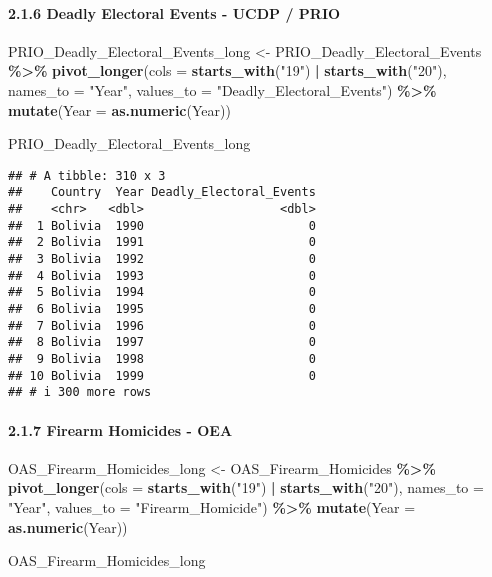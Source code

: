 \documentclass[
  11pt,
]{article}
\newenvironment{Shaded}{\begin{snugshade}}{\end{snugshade}}
\newcommand{\AttributeTok}[1]{\textcolor[rgb]{0.13,0.29,0.53}{#1}}
\newcommand{\FunctionTok}[1]{\textcolor[rgb]{0.13,0.29,0.53}{\textbf{#1}}}
\newcommand{\NormalTok}[1]{#1}
\newcommand{\OtherTok}[1]{\textcolor[rgb]{0.56,0.35,0.01}{#1}}
\newcommand{\SpecialCharTok}[1]{\textcolor[rgb]{0.81,0.36,0.00}{\textbf{#1}}}
\newcommand{\StringTok}[1]{\textcolor[rgb]{0.31,0.60,0.02}{#1}}
\begin{document}
\paragraph{2.1.6 Deadly Electoral Events - UCDP /
PRIO}\label{deadly-electoral-events---ucdp-prio-1}

\begin{Shaded}
\begin{Highlighting}[]
\NormalTok{PRIO\_Deadly\_Electoral\_Events\_long }\OtherTok{\textless{}{-}}\NormalTok{ PRIO\_Deadly\_Electoral\_Events }\SpecialCharTok{\%\textgreater{}\%}
  \FunctionTok{pivot\_longer}\NormalTok{(}\AttributeTok{cols =} \FunctionTok{starts\_with}\NormalTok{(}\StringTok{"19"}\NormalTok{) }\SpecialCharTok{|} \FunctionTok{starts\_with}\NormalTok{(}\StringTok{"20"}\NormalTok{), }
               \AttributeTok{names\_to =} \StringTok{"Year"}\NormalTok{, }\AttributeTok{values\_to =} \StringTok{"Deadly\_Electoral\_Events"}\NormalTok{) }\SpecialCharTok{\%\textgreater{}\%}
  \FunctionTok{mutate}\NormalTok{(}\AttributeTok{Year =} \FunctionTok{as.numeric}\NormalTok{(Year))}

\NormalTok{PRIO\_Deadly\_Electoral\_Events\_long}
\end{Highlighting}
\end{Shaded}

\begin{verbatim}
## # A tibble: 310 x 3
##    Country  Year Deadly_Electoral_Events
##    <chr>   <dbl>                   <dbl>
##  1 Bolivia  1990                       0
##  2 Bolivia  1991                       0
##  3 Bolivia  1992                       0
##  4 Bolivia  1993                       0
##  5 Bolivia  1994                       0
##  6 Bolivia  1995                       0
##  7 Bolivia  1996                       0
##  8 Bolivia  1997                       0
##  9 Bolivia  1998                       0
## 10 Bolivia  1999                       0
## # i 300 more rows
\end{verbatim}

\paragraph{2.1.7 Firearm Homicides -
OEA}\label{firearm-homicides---oea-1}

\begin{Shaded}
\begin{Highlighting}[]
\NormalTok{OAS\_Firearm\_Homicides\_long }\OtherTok{\textless{}{-}}\NormalTok{ OAS\_Firearm\_Homicides }\SpecialCharTok{\%\textgreater{}\%}
  \FunctionTok{pivot\_longer}\NormalTok{(}\AttributeTok{cols =} \FunctionTok{starts\_with}\NormalTok{(}\StringTok{"19"}\NormalTok{) }\SpecialCharTok{|} \FunctionTok{starts\_with}\NormalTok{(}\StringTok{"20"}\NormalTok{), }
               \AttributeTok{names\_to =} \StringTok{"Year"}\NormalTok{, }\AttributeTok{values\_to =} \StringTok{"Firearm\_Homicide"}\NormalTok{) }\SpecialCharTok{\%\textgreater{}\%}
  \FunctionTok{mutate}\NormalTok{(}\AttributeTok{Year =} \FunctionTok{as.numeric}\NormalTok{(Year))}

\NormalTok{OAS\_Firearm\_Homicides\_long}
\end{Highlighting}
\end{Shaded}
\end{document}
